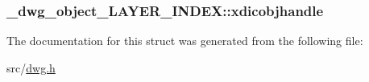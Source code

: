 \hypertarget{struct__dwg__object__LAYER__INDEX_a1ded31779df4a054cc5d9715ecdf86fe}{
\subsubsection[{xdicobjhandle}]{ {\bf \-\_\-dwg\-\_\-object\-\_\-\-L\-A\-Y\-E\-R\-\_\-\-I\-N\-D\-E\-X\-::xdicobjhandle}}}\label{struct__dwg__object__LAYER__INDEX_a1ded31779df4a054cc5d9715ecdf86fe}


\-The documentation for this struct was generated from the following file\-:\begin{DoxyCompactItemize}
\item 
src/\hyperlink{dwg_8h}{dwg.\-h}\end{DoxyCompactItemize}
